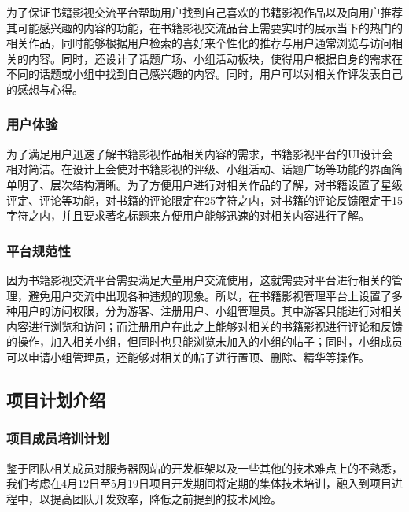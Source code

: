 \documentclass[
]{article}
\begin{document}
为了保证书籍影视交流平台帮助用户找到自己喜欢的书籍影视作品以及向用户推荐其可能感兴趣的内容的功能，在书籍影视交流品台上需要实时的展示当下的热门的相关作品，同时能够根据用户检索的喜好来个性化的推荐与用户通常浏览与访问相关的内容。同时，还设计了话题广场、小组活动板块，使得用户根据自身的需求在不同的话题或小组中找到自己感兴趣的内容。同时，用户可以对相关作评发表自己的感想与心得。

\hypertarget{header-n3729}{%
\subsubsection{用户体验}\label{header-n3729}}

为了满足用户迅速了解书籍影视作品相关内容的需求，书籍影视平台的UI设计会相对简洁。在设计上会使对书籍影视的评级、小组活动、话题广场等功能的界面简单明了、层次结构清晰。为了方便用户进行对相关作品的了解，对书籍设置了星级评定、评论等功能，对书籍的评论限定在25字符之内，对书籍的评论反馈限定于15字符之内，并且要求著名标题来方便用户能够迅速的对相关内容进行了解。

\hypertarget{header-n3731}{%
\subsubsection{平台规范性}\label{header-n3731}}

因为书籍影视交流平台需要满足大量用户交流使用，这就需要对平台进行相关的管理，避免用户交流中出现各种违规的现象。所以，在书籍影视管理平台上设置了多种用户的访问权限，分为游客、注册用户、小组管理员。其中游客只能进行对相关内容进行浏览和访问；而注册用户在此之上能够对相关的书籍影视进行评论和反馈的操作，加入相关小组，但同时也只能浏览未加入的小组的帖子；同时，小组成员可以申请小组管理员，还能够对相关的帖子进行置顶、删除、精华等操作。

\hypertarget{header-n3733}{%
\subsection{项目计划介绍}\label{header-n3733}}

\hypertarget{header-n3734}{%
\subsubsection{项目成员培训计划}\label{header-n3734}}

鉴于团队相关成员对服务器网站的开发框架以及一些其他的技术难点上的不熟悉，我们考虑在4月12日至5月19日项目开发期间将定期的集体技术培训，融入到项目进程中，以提高团队开发效率，降低之前提到的技术风险。
\end{document}
